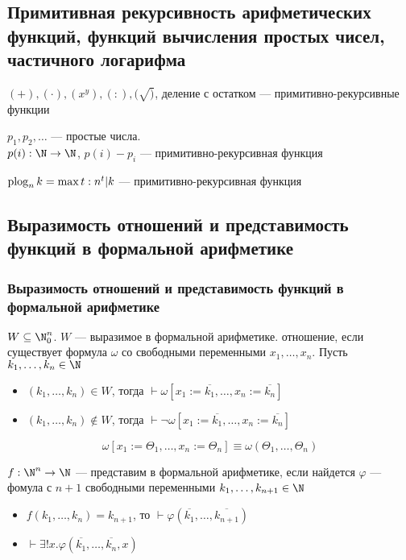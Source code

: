 \documentclass[english]{article}
\begin{document}
\subsection{Примитивная рекурсивность арифметических функций, функций вычисления простых чисел, частичного логарифма}
\label{sec:orgc7e6cb4}
\begin{theorem}
	\((+), (\cdot), (x^y), (:), (\sqrt)\), деление с остатком --- примитивно-рекурсивные функции
	\label{org7d84a87}
\end{theorem}
\begin{lemma}
	\(p_1, p_2, \dots\) --- простые числа. \\
	\(p(i): \N \to \N\), \(p(i) - p_i\) --- примитивно-рекурсивная функция
	\label{org291140c}
\end{lemma}
\begin{definition}
	\(\mathop{\rm plog}_nk = \max t: n^t | k\) --- примитивно-рекурсивная функция
	\label{org546a657}
\end{definition}
\subsection{Выразимость отношений и представимость функций в формальной арифметике}
\label{sec:org11d6cc5}
\subsubsection{Выразимость отношений и представимость функций в формальной арифметике}
\label{sec:orga0a4deb}
\begin{definition}
	\(W \subseteq \N_0^n\). \(W\) --- выразимое в формальной арифметике. отношение, если существует формула \(\omega\) со свободными переменными \(x_1,\dots,x_n\). Пусть \(k_1,\dots,k_n \in \N\)
	\begin{itemize}
		\item \((k_1,\dots,k_n) \in W\), тогда \(\vdash \omega[x_1:=\overline{k_1}, \dots, x_n := \overline{k_n}]\)
		\item \((k_1,\dots,k_n) \not\in W\), тогда \(\vdash \neg \omega[x_1:=\overline{k_1},\dots,x_n:=\overline{k_n}]\)
	\end{itemize}
	\[ \omega[x_1:=\Theta_1,\dots,x_n:=\Theta_n] \equiv \omega(\Theta_1, \dots, \Theta_n) \]
	\label{org5dedbe6}
\end{definition}
\begin{definition}
	\(f: \N^n \to \N\) --- представим в формальной арифметике, если найдется \(\varphi\) --- фомула с \(n + 1\) свободными переменными \(k_1, \dots, k_{n + 1} \in \N\)
	\begin{itemize}
		\item \(f(k_1,\dots,k_n) = k_{n + 1}\), то \(\vdash \varphi(\overline{k_1},\dots,\overline{k_{n + 1}})\) \\
		\item \(\vdash \exists! x.\varphi(\overline{k_1},\dots,\overline{k_n},x)\)
	\end{itemize}
	\label{org390a1d7}
\end{definition}
\end{document}

